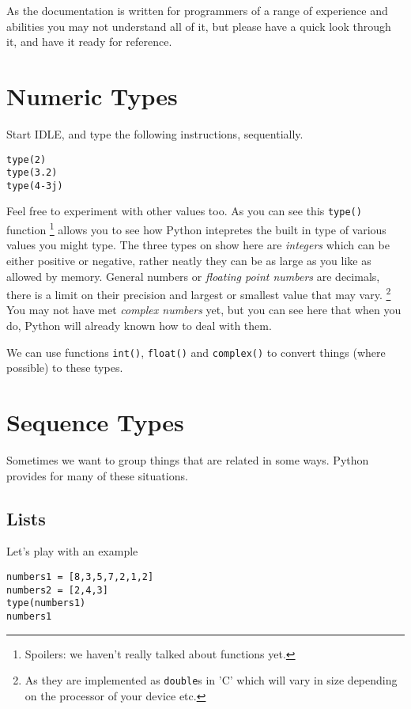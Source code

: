 \documentclass[12pt,oneside]{cttutorial}
\begin{document}
As the documentation is written for programmers of a range of experience and abilities you may not understand all of it, but please have a quick look through it, and have it ready for reference.


\section{Numeric Types}

Start IDLE, and type the following instructions, sequentially.

\begin{lstlisting}
type(2)
type(3.2)
type(4-3j)
\end{lstlisting}

Feel free to experiment with other values too. As you can see this \lstinline!type()! function%
\footnote{Spoilers: we haven't really talked about functions yet.}%
allows you to see how Python intepretes the built in type of various values you might type. The three types on show here are \emph{integers} which can be either positive or negative, rather neatly they can be as large as you like as allowed by memory. General numbers or \emph{floating point numbers} are decimals, there is a limit on their precision and largest or smallest value that may vary.%
\footnote{As they are implemented as \lstinline!double!s in 'C' which will vary in size depending on the processor of your device etc.}%
You may not have met \emph{complex numbers} yet, but you can see here that when you do, Python will already known how to deal with them.

We can use functions \lstinline!int()!, \lstinline!float()! and \lstinline!complex()! to convert things (where possible) to these types.

\section{Sequence Types}

Sometimes we want to group things that are related in some ways. Python provides for many of these situations.

\subsection{Lists}

Let's play with an example

\begin{lstlisting}
numbers1 = [8,3,5,7,2,1,2]
numbers2 = [2,4,3]
type(numbers1)
numbers1
\end{lstlisting}
\end{document}
